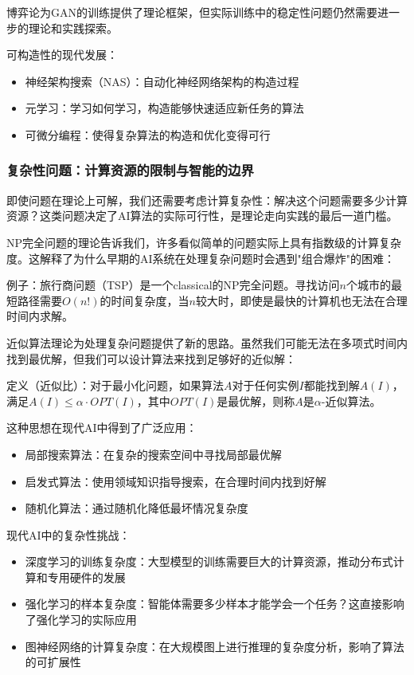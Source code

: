 博弈论为GAN的训练提供了理论框架，但实际训练中的稳定性问题仍然需要进一步的理论和实践探索。

可构造性的现代发展：

\begin{itemize}
\item 神经架构搜索（NAS）：自动化神经网络架构的构造过程
\item 元学习：学习如何学习，构造能够快速适应新任务的算法
\item 可微分编程：使得复杂算法的构造和优化变得可行
\end{itemize}

\subsubsection{复杂性问题：计算资源的限制与智能的边界}

即使问题在理论上可解，我们还需要考虑计算复杂性：解决这个问题需要多少计算资源？这类问题决定了AI算法的实际可行性，是理论走向实践的最后一道门槛。

NP完全问题的理论告诉我们，许多看似简单的问题实际上具有指数级的计算复杂度。这解释了为什么早期的AI系统在处理复杂问题时会遇到"组合爆炸"的困难：

例子：旅行商问题（TSP）是一个classical的NP完全问题。寻找访问$n$个城市的最短路径需要$O(n!)$的时间复杂度，当$n$较大时，即使是最快的计算机也无法在合理时间内求解。

近似算法理论为处理复杂问题提供了新的思路。虽然我们可能无法在多项式时间内找到最优解，但我们可以设计算法来找到足够好的近似解：

定义（近似比）：对于最小化问题，如果算法$A$对于任何实例$I$都能找到解$A(I)$，满足$A(I) \leq \alpha \cdot OPT(I)$，其中$OPT(I)$是最优解，则称$A$是$\alpha$-近似算法。

这种思想在现代AI中得到了广泛应用：

\begin{itemize}
\item 局部搜索算法：在复杂的搜索空间中寻找局部最优解
\item 启发式算法：使用领域知识指导搜索，在合理时间内找到好解
\item 随机化算法：通过随机化降低最坏情况复杂度
\end{itemize}

现代AI中的复杂性挑战：

\begin{itemize}
\item 深度学习的训练复杂度：大型模型的训练需要巨大的计算资源，推动分布式计算和专用硬件的发展
\item 强化学习的样本复杂度：智能体需要多少样本才能学会一个任务？这直接影响了强化学习的实际应用
\item 图神经网络的计算复杂度：在大规模图上进行推理的复杂度分析，影响了算法的可扩展性
\end{itemize}

